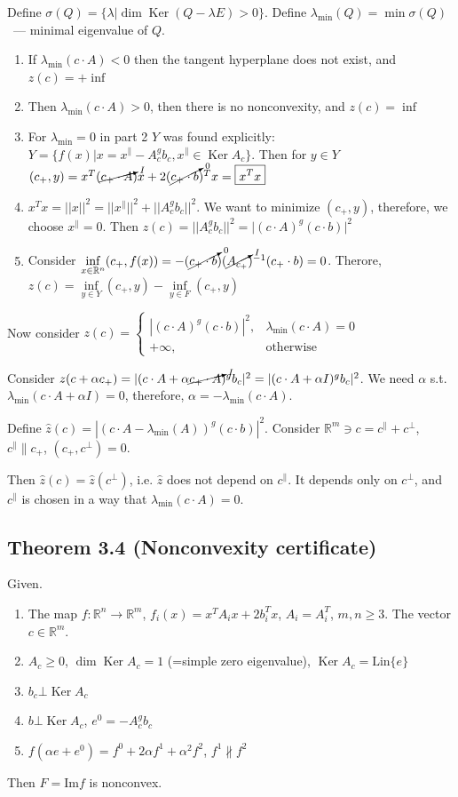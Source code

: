 \documentclass[a4paper]{article}
\DeclareMathOperator{\Ker}{Ker}
\begin{document}
Define $\sigma(Q)=\{\lambda\big |\dim\Ker (Q-\lambda E)>0\}$. Define $\lambda_{\min}(Q)=\min\sigma(Q)$~--- minimal eigenvalue of $Q$.

\begin{enumerate}
\item If $\lambda_{\min}(c\cdot A)<0$ then the tangent hyperplane does not exist, and $z(c)=+\inf$
\item Then $\lambda_{\min}(c\cdot A)>0$, then there is no nonconvexity, and $z(c)=\inf$
\item For $\lambda_{\min}=0$ in part 2 $Y$ was found explicitly: $Y=\{f(x)\big|x=x^\parallel-A_c^gb_c, x^\parallel \in\Ker A_c\}$. Then for $y\in Y$ $(c_+,y)=x^T(\cancelto{I}{c_+\cdot A})x+2(\cancelto{0}{c_+\cdot b})^Tx=\boxed{x^Tx}$
\item $x^Tx=||x||^2=||x^\parallel||^2+||A_c^gb_c||^2$. We want to minimize $(c_+,y)$, therefore, we choose $x^\parallel=0$. Then $z(c)=||A_c^gb_c||^2=\boxed{\big|(c \cdot A)^g(c\cdot b) \big|^2}$
\item Consider $\inf\limits_{x\in\mathbb{R}^n} (c_+,f(x))=-(\cancelto{0}{c_+\cdot b})(\cancelto{I}{A_{c_+}})^{-1}(c_+\cdot b)=0$. Therore, $z(c)=\inf\limits_{y\in Y}(c_+,y)-\inf\limits_{y\in F}(c_+,y)$
\end{enumerate}

Now consider $z(c)=\begin{cases}
|(c\cdot A)^g(c\cdot b)|^2,&\lambda_{\min}(c\cdot A)=0\\
+\infty, & \mbox{otherwise}
\end{cases}$

Consider $z(c+\alpha c_+)=|(c\cdot A+\alpha \cancelto{I}{c_+\cdot A})^gb_c|^2=|(c\cdot A+\alpha I)^gb_c|^2$. We need $\alpha$ s.t. $\lambda_{\min}(c\cdot A+\alpha I)=0$, therefore, $\alpha=-\lambda_{\min}(c\cdot A)$.

Define $\hat{z}(c)=|(c\cdot A-\lambda_{\min}(A))^g(c\cdot b)|^2$. Consider $\mathbb{R}^m\ni c=c^{\parallel}+c^{\bot}$, $c^{\parallel}\parallel c_+$, $(c_+,c^{\bot})=0$.

Then $\hat{z}(c)=\hat{z}(c^{\bot})$, i.e. $\hat{z}$ does not depend on $c^{\parallel}$. It depends only on $c^{\bot}$, and $c^{\parallel}$ is chosen in a way that $\lambda_{\min}(c\cdot A)=0$.
\subsection{Theorem 3.4 (Nonconvexity certificate)}
Given.
\begin{enumerate}
\item The map $f\colon\mathbb{R}^n\to\mathbb{R}^m$, $f_i(x)=x^TA_ix+2b_i^Tx$, $A_i=A_i^T$, $m,n\geqslant 3$. The vector $c\in\mathbb{R}^m$.
\item $A_c\geqslant 0$, $\dim\Ker A_c=1$ (=simple zero eigenvalue), $\Ker A_c=\mbox{Lin}\{e\}$
\item $b_c\bot \Ker A_c$
\item $b\bot\Ker A_c$, $e^0=-A_c^gb_c$
\item $f(\alpha e+e^0)=f^0+2\alpha f^1+\alpha^2f^2$, $f^1\nparallel f^2$
\end{enumerate}
Then $F=\mbox{Im} f$ is nonconvex.
\end{document}
